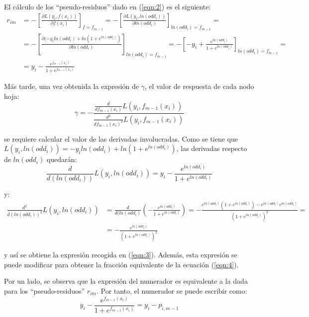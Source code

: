 \documentclass[12pt,twoside]{article}
\begin{document}
El cálculo de los ``pseudo-residuos'' dado en (\ref{eqn:2}) es el siguiente:
\begin{equation*}
\begin{split}
r_{im} &= -\left[ \frac{\partial L(y_i, f(x_i))}{\partial f(x_i)} \right]_{f=f_{m-1}} = - \left[ \frac{\partial L(y_i, ln(odd_i))}{\partial ln(odd_i)} \right]_{ln(odd_i)=f_{m-1}} = \\
& = - \left[ \frac{\partial (-y_iln(odd_i) + ln(1+e^{ln(odd_i)})}{\partial ln(odd_i)} \right]_{ln(odd_i)=f_{m-1}} = - \left[ - y_i + \frac{e^{ln(odd_i)}}{1 + e^{ln(odd_i)}} \right]_{ln(odd_i) = f_{m-1}} =  \\
& = y_i - \frac{e^{f_{m-1}(x_i)}}{1 + e^{f_{m-1}(x_i)}}
\end{split}
\end{equation*}

Más tarde, una vez obtenida la expresión de $\gamma$, el valor de respuesta de cada nodo hoja:
\begin{equation*}
\gamma = - \frac{\frac{d}{df_{m-1}(x_i)}L(y_i, f_{m-1}(x_i))}{\frac{d^2}{df_{m-1}(x_i)^2}L(y_i, f_{m-1}(x_i))}
\end{equation*}

\noindent
se requiere calcular el valor de las derivadas involucradas. Como se tiene que $L(y_i, ln(odd_i)) = -y_iln(odd_i) + ln(1 + e^{ln(odd_i)})$, las derivadas respecto de $ln(odd_i)$ quedarán:
\begin{equation*}
\frac{d}{d(ln(odd_i))}L(y_i, ln(odd_i)) = y_i - \frac{e^{ln(odd_i)}}{1 + e^{ln(odd_i)}}
\end{equation*}

\noindent
y:
\begin{equation*}
\begin{split}
\frac{d^2}{d(ln(odd_i))^2}L(y_i, ln(odd_i)) &=\frac{d}{d(ln(odd_i)} \left( - \frac{e^{ln(odd_i)}}{1 + e^{ln(odd_i)}} \right) = - \frac{e^{ln(odd_i)}(1 + e^{ln(odd_i)}) - e^{ln(odd_i)}e^{ln(odd_i)}}{(1 + e^{ln(odd_i)})^2} = \\
&= - \frac{e^{ln(odd_i)}}{(1 + e^{ln(odd_i)})^2}
\end{split}
\end{equation*}

\noindent
y así se obtiene la expresión recogida en (\ref{eqn:3}). Además, esta expresión se puede modificar para obtener la fracción equivalente de la ecuación (\ref{eqn:4}).

Por un lado, se observa que la expresión del numerador es equivalente a la dada para los ``pseudo-residuos'' $r_{im}$. Por tanto, el numerador se puede escribir como:
\begin{equation*}
y_i - \frac{e^{f_{m-1}(x_i)}}{1 + e^{f_{m-1}(x_i)}} = y_i - p_{i, m-1}
\end{equation*}
\end{document}
